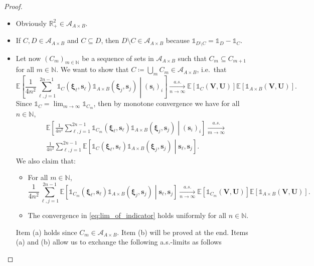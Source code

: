 \documentclass[10pt,a4paper]{amsart}
\def\E{\mathbb{E}}
\def\N{\mathbb{N}}
\def\R{\mathbb{R}}
\begin{document}
\begin{proof}
\begin{itemize}
\item Obviously $\R_+^2\in \mathcal{A}_{A\times B}$.
\item If $C,D\in\mathcal{A}_{A\times B}$ and $C\subseteq D$, then $D\setminus C\in \mathcal{A}_{A\times B}$ because $\mathds{1}_{D\setminus C}=\mathds{1}_{D}-\mathds{1}_{C}$. 
\item Let now $(C_m)_{m\in\N}$ be a sequence of sets in $\mathcal{A}_{A\times B}$ such that $C_m \subseteq C_{m+1}$ for all $m\in\N$. We want to show that $C\coloneqq\bigcup_m C_m\in \mathcal{A}_{A\times B}$, i.e.\ that 
\begin{equation}\label{eq:ifbueiwbfowebnfoewinf}
\E\left[\frac{1}{4n^2}\sum_{\ell,j=1}^{2n-1}\mathds{1}_{C}\left(\bm \xi_\ell,\bm s_\ell\right)\mathds{1}_{A\times B}\left(\bm \xi_j,\bm s_j\right)\middle| ( \bm s_i)_i\right]
\xrightarrow[n\to\infty]{a.s.} 
\E\left[\mathds{1}_{C}(\bm V,\bm U)\right]\E\left[\mathds{1}_{A \times B}(\bm V,\bm U)\right].
\end{equation}
Since $\mathds{1}_{C}=\lim_{m\to \infty}\mathds{1}_{C_m}$, then by monotone convergence we have for all $n\in \N$,
\begin{multline}\label{eq:lim_of_indicator}
\E\left[\frac{1}{4n^2}\sum_{\ell,j=1}^{2n-1}\mathds{1}_{C_m}\left(\bm \xi_\ell,\bm s_\ell\right)\mathds{1}_{A\times B}\left(\bm \xi_j,\bm s_j\right)\middle| ( \bm s_i)_i\right]
\xrightarrow[m\to\infty]{a.s.}\\
\frac{1}{4n^2}\sum_{\ell,j=1}^{2n-1}\E\left[\mathds{1}_{C}\left(\bm \xi_\ell,\bm s_\ell\right)\mathds{1}_{A\times B}\left(\bm \xi_j,\bm s_j\right)\middle|  \bm s_\ell,\bm s_j\right].
\end{multline}
We also claim that:
\begin{itemize}
	\item[(a)] For all $m\in\N$, 
	\begin{equation}
	\frac{1}{4n^2}\sum_{\ell,j=1}^{2n-1}\E\left[\mathds{1}_{C_m}\left(\bm \xi_\ell,\bm s_\ell\right)\mathds{1}_{A\times B}\left(\bm \xi_j,\bm s_j\right)\middle|  \bm s_\ell,\bm s_j\right]\xrightarrow[n\to\infty]{a.s.} \E\left[\mathds{1}_{C_m}(\bm V,\bm U)\right]\E\left[\mathds{1}_{A \times B}(\bm V,\bm U)\right].
	\end{equation}
	\item[(b)] The convergence in \cref{eq:lim_of_indicator} holds uniformly for all $n\in\N$.
\end{itemize}
Item (a) holds since $C_m \in \mathcal{A}_{A\times B}$.
Item (b) will be proved at the end. Items (a) and (b) allow us to exchange the following a.s.-limits as follows 

\end{itemize}
\end{proof}
\end{document}
